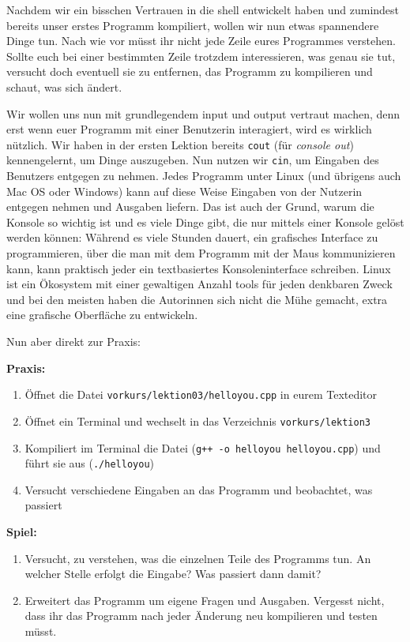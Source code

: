 
Nachdem wir ein bisschen Vertrauen in die shell entwickelt haben und zumindest
bereits unser erstes Programm kompiliert, wollen wir nun etwas spannendere
Dinge tun. Nach wie vor müsst ihr nicht jede Zeile eures Programmes verstehen.
Sollte euch bei einer bestimmten Zeile trotzdem interessieren, was genau sie
tut, versucht doch eventuell sie zu entfernen, das Programm zu kompilieren und
schaut, was sich ändert.

Wir wollen uns nun mit grundlegendem input und output vertraut machen, denn
erst wenn euer Programm mit einer Benutzerin interagiert, wird es wirklich
nützlich. Wir haben in der ersten Lektion bereits \texttt{cout} (für
\emph{console out}) kennengelernt, um Dinge auszugeben. Nun nutzen wir
\texttt{cin}, um Eingaben des Benutzers entgegen zu nehmen. Jedes Programm
unter Linux (und übrigens auch Mac OS oder Windows) kann auf diese Weise
Eingaben von der Nutzerin entgegen nehmen und Ausgaben liefern. Das ist auch
der Grund, warum die Konsole so wichtig ist und es viele Dinge gibt, die nur
mittels einer Konsole gelöst werden können: Während es viele Stunden dauert,
ein grafisches Interface zu programmieren, über die man mit dem Programm mit
der Maus kommunizieren kann, kann praktisch jeder ein textbasiertes
Konsoleninterface schreiben. Linux ist ein Ökosystem mit einer gewaltigen
Anzahl tools für jeden denkbaren Zweck und bei den meisten haben die Autorinnen
sich nicht die Mühe gemacht, extra eine grafische Oberfläche zu entwickeln.

Nun aber direkt zur Praxis:

\textbf{Praxis:}
\begin{enumerate}
    \item Öffnet die Datei \texttt{vorkurs/lektion03/helloyou.cpp} in eurem Texteditor
    \item Öffnet ein Terminal und wechselt in das Verzeichnis \texttt{vorkurs/lektion3}
    \item Kompiliert im Terminal die Datei (\texttt{g++ -o helloyou
        helloyou.cpp}) und führt sie aus (\texttt{./helloyou})
    \item Versucht verschiedene Eingaben an das Programm und beobachtet, was passiert
\end{enumerate}


\textbf{Spiel:}

\begin{enumerate}
    \item Versucht, zu verstehen, was die einzelnen Teile des Programms tun. An
        welcher Stelle erfolgt die Eingabe? Was passiert dann damit?
    \item Erweitert das Programm um eigene Fragen und Ausgaben. Vergesst nicht,
        dass ihr das Programm nach jeder Änderung neu kompilieren und testen
        müsst.
\end{enumerate}
